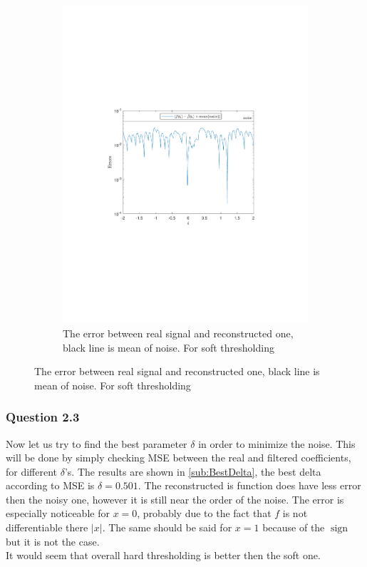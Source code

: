 \documentclass[a4paper]{article}
\DeclareMathOperator*{\sign}{sign}
\begin{document}
\begin{figure}[H]
\begin{subfigure}{0.49\textwidth}
\includegraphics[trim={3.5cm 8cm 4cm 9cm},clip,width=1\textwidth]{Images/Delta=0.1Soft.pdf}
\caption{The error between real signal and reconstructed one, black line is mean of noise. For soft thresholding}
\label{sub:Delta=0.1BetterSoft}
\end{subfigure}
\end{figure}


    \subsubsection{Question 2.3}

	Now let us try to find the best parameter $\delta$ in order to minimize the noise. This will be done by simply checking MSE between the real and filtered coefficients, for different $\delta$'s. The results are shown in \cref{sub:BestDelta}, the best delta according to MSE is $\delta = 0.501$. The reconstructed is function does have less error then the noisy one, however it is still near the order of the noise. The error is especially noticeable for $x = 0$, probably due to the fact that $f$ is not differentiable there $|x|$. The same should be said for $x = 1$ because of the $\sign$ but it is not the case.\\
	It would seem that overall hard thresholding is better then the soft one.
\end{document}
